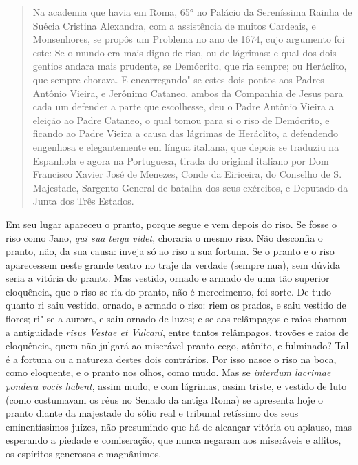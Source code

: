 \begin{quotation}
\noindent{}Na academia que havia em Roma, 65° no Palácio da Sereníssima Rainha de
Suécia Cristina Alexandra, com a assistência de muitos Cardeais, e
Monsenhores, se propôs um Problema no ano de 1674, cujo argumento foi
este: Se o mundo era mais digno de riso, ou de lágrimas: e qual dos dois
gentios andara mais prudente, se Demócrito, que ria sempre; ou
Heráclito, que sempre chorava. E encarregando"-se estes dois pontos aos
Padres Antônio Vieira, e Jerônimo Cataneo, ambos da Companhia de Jesus
para cada um defender a parte que escolhesse, deu o Padre Antônio Vieira
a eleição ao Padre Cataneo, o qual tomou para si o riso de Demócrito, e
ficando ao Padre Vieira a causa das lágrimas de Heráclito, a defendendo
engenhosa e elegantemente em língua italiana, que depois se traduziu na
Espanhola e agora na Portuguesa, tirada do original italiano por Dom
Francisco Xavier José de Menezes, Conde da Eiriceira, do Conselho de S.\,Majestade, Sargento General de batalha dos seus exércitos, e Deputado da
Junta dos Três Estados.
\end{quotation}

\noindent{}Em seu lugar apareceu o pranto, porque segue e vem depois do riso. Se
fosse o riso como Jano, \emph{qui sua terga videt}, choraria o mesmo riso. Não
desconfia o pranto,
não, da sua causa: inveja só ao riso a sua fortuna. Se o pranto e o riso
aparecessem neste grande teatro no traje da verdade (sempre nua), sem
dúvida seria a vitória do pranto. Mas vestido, ornado e armado de uma
tão superior eloquência, que o riso se ria do pranto, não é merecimento,
foi sorte. De tudo quanto ri saiu vestido, ornado, e armado o riso: riem
os prados, e saiu vestido de flores; ri"-se a aurora, e saiu ornado de
luzes; e se aos relâmpagos e raios chamou a antiguidade \emph{risus
Vestae et Vulcani}, entre tantos relâmpagos, trovões e raios de
eloquência, quem não julgará ao miserável pranto cego, atônito, e
fulminado? Tal é a fortuna ou a natureza destes dois contrários. Por
isso nasce o riso na boca, como eloquente, e o pranto nos olhos, como
mudo. Mas se \emph{interdum lacrimae pondera vocis habent}, assim mudo,
e com lágrimas, assim triste, e vestido de luto (como costumavam os réus no
Senado da antiga Roma) se apresenta hoje o pranto diante da majestade
do sólio real e tribunal retíssimo dos seus eminentíssimos juízes, não
presumindo que há de alcançar vitória ou aplauso, mas esperando a
piedade e comiseração, que nunca negaram aos miseráveis e aflitos, os
espíritos generosos e magnânimos.

